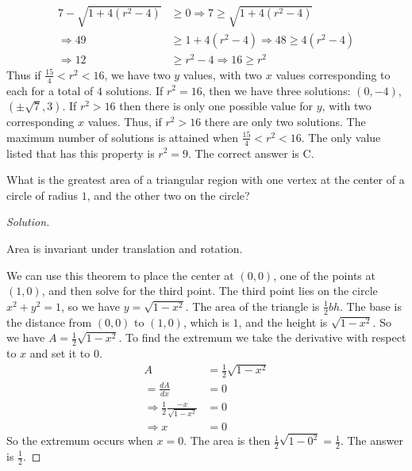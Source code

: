 \documentclass[crop=false,class=book,oneside]{standalone}
\begin{document}
\begin{lexample}
                \begin{align*}
                    7-\sqrt{1+4(r^{2}-4)}&\geq 0
                    \Rightarrow 7\geq\sqrt{1+4(r^{2}-4)}\\
                    \Rightarrow 49&\geq 1+4(r^{2}-4)\Rightarrow
                    48\geq 4(r^{2}-4)\\
                    \Rightarrow 12&\geq r^{2}-4\Rightarrow 16\geq r^{2}
                \end{align*}
                Thus if $\frac{15}{4}<r^2<16$, we have two
                $y$ values, with two $x$ values corresponding
                to each for a total of $4$ solutions.
                If $r^2 = 16$, then we have three solutions:
                $(0,-4)$, $(\pm \sqrt{7},3)$. If $r^2>16$
                then there is only one possible value for
                $y$, with two corresponding $x$ values.
                Thus, if $r^2>16$ there are only two solutions.
                The maximum number of solutions is attained
                when $\frac{15}{4} < r^2 <16$. The only value
                listed that has this property is $r^2 = 9$.
                The correct answer is C.
            \end{lexample}
        \begin{problem}
            What is the greatest area of a triangular
            region with one vertex at the center of
            a circle of radius $1$, and the other
            two on the circle?
        \end{problem}
        \begin{proof}[Solution]
        \begin{theorem*}
            Area is invariant under translation
            and rotation.
        \end{theorem*}
            We can use this theorem to place the center
            at $(0,0)$, one of the points at $(1,0)$,
            and then solve for the third point. The third
            point lies on the circle $x^2+y^2 = 1$, so
            we have $y = \sqrt{1-x^2}$. The area of
            the triangle is $\frac{1}{2}bh$. The base
            is the distance from $(0,0)$ to $(1,0)$,
            which is $1$, and the height is $\sqrt{1-x^2}$.
            So we have $A = \frac{1}{2}\sqrt{1-x^2}$.
            To find the extremum we take the derivative
            with respect to $x$ and set it to $0$.
            \begin{align*}
                A&=\frac{1}{2}\sqrt{1-x^{2}}\\
                =\frac{dA}{dx}&=0\\
                \Rightarrow\frac{1}{2}\frac{-x}{\sqrt{1-x^{2}}}&=0\\
                \Rightarrow x&=0
            \end{align*}
            So the extremum occurs when $x=0$. The area is then $\frac{1}{2}\sqrt{1-0^2} = \frac{1}{2}$. The answer is $\frac{1}{2}$.
            \end{proof}
\end{document}

